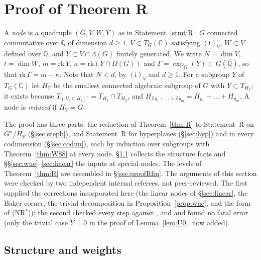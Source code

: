 \documentclass[11pt]{amsart}
\theoremstyle{definition}
\newcommand{\Qb}{\overline{\mathbb{Q}}}
\newcommand{\C}{\mathbb{C}}
\newcommand{\Z}{\mathbb{Z}}
\begin{document}
\section{Proof of Theorem R}\label{sec:proofR}
A \emph{node} is a quadruple $(G,V,W,Y)$ as in Statement~\ref{stmt:R}: $G$ connected commutative over $\Qb$ of dimension
$d\ge1$, $V\subset T_G(\C)$ satisfying $(\mathrm i)_V$, $W\subset V$ defined over $\Qb$, and $Y\subset V\cap\Lambda(G)$
finitely generated. We write $N=\dim V$, $t=\dim W$, $m=\mathrm{rk}\,Y$, $\kappa=\mathrm{rk}(Y\cap\Omega(G))$ and
$\Gamma=\exp_G(Y)\subset G(\Qb)$, so that $\mathrm{rk}\,\Gamma=m-\kappa$. Note that $N<d$, by $(\mathrm i)_V$ and $d\ge1$.
For a subgroup $Y$ of $T_G(\C)$ let $H_Y$ be the smallest connected algebraic subgroup of $G$ with $Y\subset T_{H_Y}$; it
exists because $T_{(H_1\cap H_2)^\circ}=T_{H_1}\cap T_{H_2}$, and $H_{\Z y_1+\dots+\Z y_m}=H_{y_1}+\dots+H_{y_m}$. A node is
\emph{reduced} if $H_Y=G$.

The proof has three parts: the reduction of Theorem~\ref{thm:R} to Statement~R on $G^n/H_\Psi$ (\S\ref{sec:stepb}), and
Statement~R for hyperplanes (\S\ref{sec:hyp}) and in every codimension (\S\ref{sec:codim}), each by induction over
subgroups with Theorem~\ref{thm:W88} at every node. \S\ref{sec:struct} collects the structure facts and
\S\S\ref{sec:wue}--\ref{sec:linear} the inputs at special nodes. The levels of Theorem~\ref{thm:R} are assembled in
\S\ref{sec:proofRfin}. The arguments of this section were checked by two independent internal referees, not
peer-reviewed. The first supplied the corrections incorporated here (the linear nodes of \S\ref{sec:linear}, the Baker
corner, the trivial decomposition in Proposition~\ref{prop:wue}, and the form of (NR$^*$)); the second checked every step
against \cite{RW93}, \cite{W88} and \cite{W00} and found no fatal error (only the trivial case $Y=0$ in the proof of
Lemma~\ref{lem:U0}, now added).

\subsection{Structure and weights}\label{sec:struct}
\end{document}
